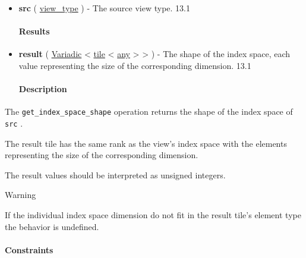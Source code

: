 \documentclass{article}
\begin{document}
\begin{itemize}
\item \textbf{src} ( \href{https://docs.nvidia.com/cuda/tile-ir/latest/sections/operations.html#type-view-type}{view\_type} ) - The source view type. 13.1


\paragraph{Results}

\item \textbf{result} ( \href{https://docs.nvidia.com/cuda/tile-ir/latest/sections/operations.html#type-variadic}{Variadic} < \href{https://docs.nvidia.com/cuda/tile-ir/latest/sections/types.html#type-tile}{tile} < \href{https://docs.nvidia.com/cuda/tile-ir/latest/sections/operations.html#type-any}{any} > > ) - The shape of the index space, each value representing the size of the corresponding dimension. 13.1


\paragraph{Description}

\end{itemize}
The \texttt{get\_index\_space\_shape} operation returns the shape of the index space of \texttt{src} .


The result tile has the same rank as the view's index space with the elements representing the size of the corresponding dimension.


The result values should be interpreted as unsigned integers.


Warning


If the individual index space dimension do not fit in the result tile's element type the behavior is undefined.



\paragraph{Constraints}
\end{document}
